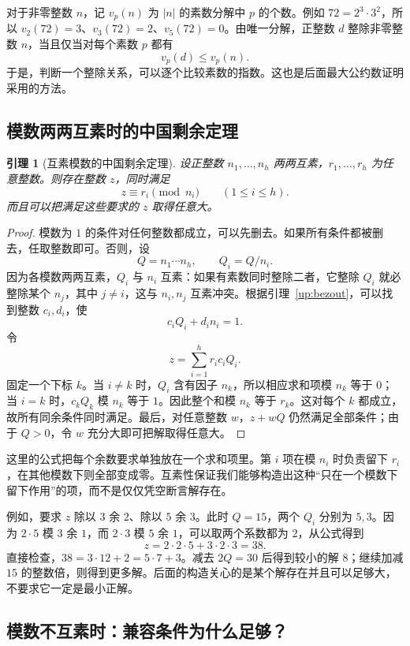 \documentclass[UTF8,a4paper,oneside,openany,fontset=fandol,zihao=-4]{ctexbook}
\theoremstyle{guide}
\newtheorem{lemma}[theorem]{引理}
\begin{document}
对于非零整数 $n$，记 $v_p(n)$ 为 $|n|$ 的素数分解中 $p$ 的个数。例如 $72=2^3\cdot3^2$，所以 $v_2(72)=3$、$v_3(72)=2$、$v_5(72)=0$。由唯一分解，正整数 $d$ 整除非零整数 $n$，当且仅当对每个素数 $p$ 都有
\[
v_p(d)\leq v_p(n).
\]
于是，判断一个整除关系，可以逐个比较素数的指数。这也是后面最大公约数证明采用的方法。

\subsection{模数两两互素时的中国剩余定理}

\begin{lemma}[互素模数的中国剩余定理]\label{up:coprime-crt}
设正整数 $n_1,\ldots,n_h$ 两两互素，$r_1,\ldots,r_h$ 为任意整数。则存在整数 $z$，同时满足
\[
z\equiv r_i\pmod{n_i}\qquad(1\leq i\leq h).
\]
而且可以把满足这些要求的 $z$ 取得任意大。
\end{lemma}

\begin{proof}
模数为 $1$ 的条件对任何整数都成立，可以先删去。如果所有条件都被删去，任取整数即可。否则，设
\[
Q=n_1\cdots n_h,\qquad Q_i=Q/n_i.
\]
因为各模数两两互素，$Q_i$ 与 $n_i$ 互素：如果有素数同时整除二者，它整除 $Q_i$ 就必整除某个 $n_j$，其中 $j\ne i$，这与 $n_i,n_j$ 互素冲突。根据引理~\ref{up:bezout}，可以找到整数 $c_i,d_i$，使
\[
c_iQ_i+d_in_i=1.
\]
令
\[
z=\sum_{i=1}^h r_i c_iQ_i.
\]
固定一个下标 $k$。当 $i\ne k$ 时，$Q_i$ 含有因子 $n_k$，所以相应求和项模 $n_k$ 等于 $0$；当 $i=k$ 时，$c_kQ_k$ 模 $n_k$ 等于 $1$。因此整个和模 $n_k$ 等于 $r_k$。这对每个 $k$ 都成立，故所有同余条件同时满足。最后，对任意整数 $w$，$z+wQ$ 仍然满足全部条件；由于 $Q>0$，令 $w$ 充分大即可把解取得任意大。
\end{proof}

这里的公式把每个余数要求单独放在一个求和项里。第 $i$ 项在模 $n_i$ 时负责留下 $r_i$，在其他模数下则全部变成零。互素性保证我们能够构造出这种“只在一个模数下留下作用”的项，而不是仅仅凭空断言解存在。

例如，要求 $z$ 除以 $3$ 余 $2$、除以 $5$ 余 $3$。此时 $Q=15$，两个 $Q_i$ 分别为 $5,3$。因为 $2\cdot5$ 模 $3$ 余 $1$，而 $2\cdot3$ 模 $5$ 余 $1$，可以取两个系数都为 $2$，从公式得到
\[
z=2\cdot2\cdot5+3\cdot2\cdot3=38.
\]
直接检查，$38=3\cdot12+2=5\cdot7+3$。减去 $2Q=30$ 后得到较小的解 $8$；继续加减 $15$ 的整数倍，则得到更多解。后面的构造关心的是某个解存在并且可以足够大，不要求它一定是最小正解。

\subsection{模数不互素时：兼容条件为什么足够？}
\end{document}
